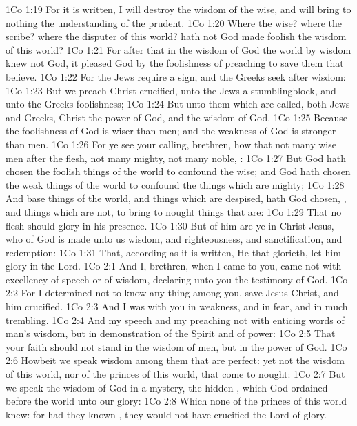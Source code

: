 \vs 1Co 1:19 For it is written, I will destroy the wisdom of the wise, and will bring to nothing the understanding of the prudent.
\vs 1Co 1:20 Where  the wise? where  the scribe? where  the disputer of this world? hath not God made foolish the wisdom of this world?
\vs 1Co 1:21 For after that in the wisdom of God the world by wisdom knew not God, it pleased God by the foolishness of preaching to save them that believe.
\vs 1Co 1:22 For the Jews require a sign, and the Greeks seek after wisdom:
\vs 1Co 1:23 But we preach Christ crucified, unto the Jews a stumblingblock, and unto the Greeks foolishness;
\vs 1Co 1:24 But unto them which are called, both Jews and Greeks, Christ the power of God, and the wisdom of God.
\vs 1Co 1:25 Because the foolishness of God is wiser than men; and the weakness of God is stronger than men.
\vs 1Co 1:26 For ye see your calling, brethren, how that not many wise men after the flesh, not many mighty, not many noble, :
\vs 1Co 1:27 But God hath chosen the foolish things of the world to confound the wise; and God hath chosen the weak things of the world to confound the things which are mighty;
\vs 1Co 1:28 And base things of the world, and things which are despised, hath God chosen, , and things which are not, to bring to nought things that are:
\vs 1Co 1:29 That no flesh should glory in his presence.
\vs 1Co 1:30 But of him are ye in Christ Jesus, who of God is made unto us wisdom, and righteousness, and sanctification, and redemption:
\vs 1Co 1:31 That, according as it is written, He that glorieth, let him glory in the Lord.
\vs 1Co 2:1 And I, brethren, when I came to you, came not with excellency of speech or of wisdom, declaring unto you the testimony of God.
\vs 1Co 2:2 For I determined not to know any thing among you, save Jesus Christ, and him crucified.
\vs 1Co 2:3 And I was with you in weakness, and in fear, and in much trembling.
\vs 1Co 2:4 And my speech and my preaching  not with enticing words of man's wisdom, but in demonstration of the Spirit and of power:
\vs 1Co 2:5 That your faith should not stand in the wisdom of men, but in the power of God.
\vs 1Co 2:6 Howbeit we speak wisdom among them that are perfect: yet not the wisdom of this world, nor of the princes of this world, that come to nought:
\vs 1Co 2:7 But we speak the wisdom of God in a mystery,  the hidden , which God ordained before the world unto our glory:
\vs 1Co 2:8 Which none of the princes of this world knew: for had they known , they would not have crucified the Lord of glory.
